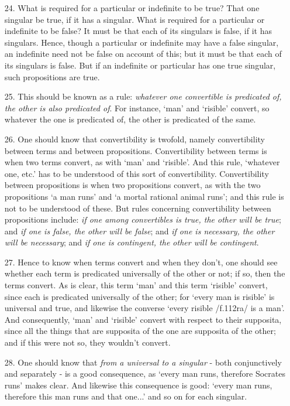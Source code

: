 \begin{enumerate}
\item[24.] What is required for a particular or indefinite to be true? That one singular be true, if it has a singular. What is required for a particular or indefinite to be false? It must be that each of its singulars is false, if it has singulars. Hence, though a particular or indefinite may have a false singular, an indefinite need not be false on account of this; but it must be that each of its singulars is false. But if an indefinite or particular has one true singular, such propositions are true. 
\item[25.] This should be known as a rule: \textit{whatever one convertible is predicated of, the other is also predicated of}. For instance, `man' and `risible' convert, so whatever the one is predicated of, the other is predicated of the same.
\item[26.] One should know that convertibility is twofold, namely convertibility between terms and between propositions. Convertibility between terms is when two terms convert, as with `man' and `risible'. And this rule, `whatever one, etc.' has to be understood of this sort of convertibility. Convertibility between propositions is when two propositions convert, as with the two propositions `a man runs' and `a mortal rational animal runs'; and this rule is not to be understood of these. But rules concerning convertibility between propositions include: \textit{if one among convertibles is true, the other will be true}; and \textit{if one is false, the other will be false}; and \textit{if one is necessary, the other will be necessary}; and \textit{if one is contingent, the other will be contingent}.
\item[27.] Hence to know when terms convert and when they don't, one should see whether each term is predicated universally of the other or not; if so, then the terms convert. As is clear, this term `man' and this term `risible' convert, since each is predicated universally of the other; for `every man is risible' is universal and true, and likewise the converse `every risible /f.112ra/ is a man'. And consequently, `man' and `risible' convert with respect to their supposita, since all the things that are supposita of the one are supposita of the other; and if this were not so, they wouldn't convert.
\item[28.] One should know that \textit{from a universal to a singular} - both conjunctively and separately - is a good consequence, as `every man runs, therefore Socrates runs' makes clear. And likewise this consequence is good: `every man runs, therefore this man runs and that one...' and so on for each singular. 

\end{enumerate}
